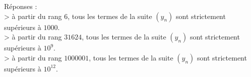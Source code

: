 \documentclass[11pt]{article}
\begin{document}
    Réponses :\\
\textgreater{} à partir du rang \(6\), tous les termes de la suite
\((y_n)\) sont strictement supérieurs à \(1000\).\\
\textgreater{} à partir du rang \(31624\), tous les termes de la suite
\((y_n)\) sont strictement supérieurs à \(10^{9}\).\\
\textgreater{} à partir du rang \(1000001\), tous les termes de la suite
\((y_n)\) sont strictement supérieurs à \(10^{12}\).


    
    
    
    
\end{document}
